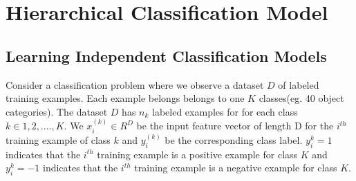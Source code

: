 \documentclass[10pt,twocolumn,letterpaper]{article}
\begin{document}


\section{Hierarchical Classification Model}

\subsection{Learning Independent Classification Models}

Consider a classification problem where we observe a dataset $D$ of labeled  training examples. 
Each example belongs belongs to one $K$ classes(eg. 40 object categories). The dataset $D$
has $n_{k}$ labeled examples for for each class $k  \in {1,2,....,K} $. We $x_{i}^{(k)} \in R^{D} $ 
be the input feature vector of length D for the $i^{th}$ training example of class $k$ and 
$y_{i}^{(k)}$ be the corresponding class label. $ y_{i}^{k} = 1 $ indicates that the $i^{th}$ training example 
is a positive example for class $K$ and  $ y_{i}^{k} = -1 $ indicates that the $i^{th}$ training example 
is a negative example for class $K$.
\end{document}
